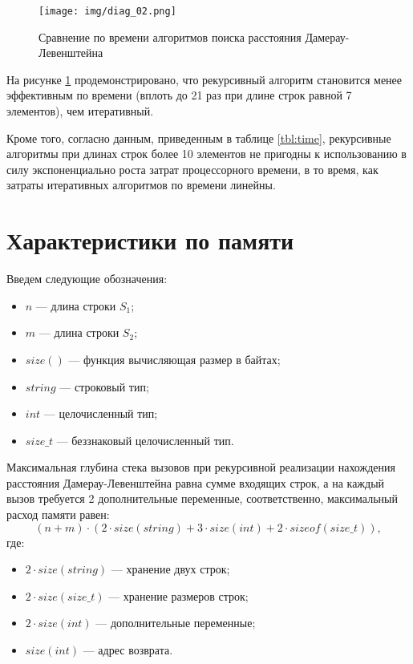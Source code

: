 \begin{figure}[h]
	\centering
	\texttt{[image: img/diag\_02.png]}
	\caption{Сравнение по времени алгоритмов поиска расстояния Дамерау-Левенштейна}
	\label{plt:time_02}
\end{figure}

На рисунке \ref{plt:time_02} продемонстрировано, что рекурсивный алгоритм становится менее эффективным по времени (вплоть до 21 раз при длине строк равной 7 элементов), чем итеративный.

Кроме того, согласно данным, приведенным в таблице \ref{tbl:time}, рекурсивные алгоритмы при длинах строк более 10 элементов не пригодны к использованию в силу экспоненциально роста затрат процессорного времени, в то время, как затраты итеративных алгоритмов по времени линейны.

\section{Характеристики по памяти}

Введем следующие обозначения:
\begin{itemize}
	\item$n$ --- длина строки $S_{1}$;
	\item$m$ --- длина строки $S_{2}$;
	\item$size()$ --- функция вычисляющая размер в байтах;
	\item $string$ --- строковый тип;
	\item $int$ --- целочисленный тип;
	\item $size\_t$ --- беззнаковый целочисленный тип.
\end{itemize}

Максимальная глубина стека вызовов при рекурсивной реализации нахождения расстояния Дамерау-Левенштейна равна сумме входящих строк, а на каждый вызов требуется 2 дополнительные переменные, соответственно, максимальный расход памяти равен:
\begin{equation}
	\label{eq:dl_rec_memory}
	(n + m) \cdot (2 \cdot size(string) + 3 \cdot size(int) + 2 \cdot sizeof(size\_t)),
\end{equation}
где:
\begin{itemize}
	\item $2 \cdot size(string)$ --- хранение двух строк;
	\item $2 \cdot size(size\_t)$ --- хранение размеров строк;
	\item $2 \cdot size(int)$ --- дополнительные переменные;
	\item $size(int)$ --- адрес возврата.
\end{itemize}

